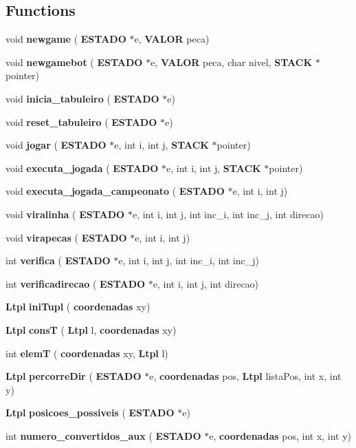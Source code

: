 \subsection*{Functions}
\begin{DoxyCompactItemize}
\item 
void \textbf{ newgame} (\textbf{ E\+S\+T\+A\+DO} $\ast$e, \textbf{ V\+A\+L\+OR} peca)
\item 
void \textbf{ newgamebot} (\textbf{ E\+S\+T\+A\+DO} $\ast$e, \textbf{ V\+A\+L\+OR} peca, char nivel, \textbf{ S\+T\+A\+CK} $\ast$pointer)
\item 
void \textbf{ inicia\+\_\+tabuleiro} (\textbf{ E\+S\+T\+A\+DO} $\ast$e)
\item 
void \textbf{ reset\+\_\+tabuleiro} (\textbf{ E\+S\+T\+A\+DO} $\ast$e)
\item 
void \textbf{ jogar} (\textbf{ E\+S\+T\+A\+DO} $\ast$e, int i, int j, \textbf{ S\+T\+A\+CK} $\ast$pointer)
\item 
void \textbf{ executa\+\_\+jogada} (\textbf{ E\+S\+T\+A\+DO} $\ast$e, int i, int j, \textbf{ S\+T\+A\+CK} $\ast$pointer)
\item 
void \textbf{ executa\+\_\+jogada\+\_\+campeonato} (\textbf{ E\+S\+T\+A\+DO} $\ast$e, int i, int j)
\item 
void \textbf{ viralinha} (\textbf{ E\+S\+T\+A\+DO} $\ast$e, int i, int j, int inc\+\_\+i, int inc\+\_\+j, int direcao)
\item 
void \textbf{ virapecas} (\textbf{ E\+S\+T\+A\+DO} $\ast$e, int i, int j)
\item 
int \textbf{ verifica} (\textbf{ E\+S\+T\+A\+DO} $\ast$e, int i, int j, int inc\+\_\+i, int inc\+\_\+j)
\item 
int \textbf{ verificadirecao} (\textbf{ E\+S\+T\+A\+DO} $\ast$e, int i, int j, int direcao)
\item 
\textbf{ Ltpl} \textbf{ ini\+Tupl} (\textbf{ coordenadas} xy)
\item 
\textbf{ Ltpl} \textbf{ consT} (\textbf{ Ltpl} l, \textbf{ coordenadas} xy)
\item 
int \textbf{ elemT} (\textbf{ coordenadas} xy, \textbf{ Ltpl} l)
\item 
\textbf{ Ltpl} \textbf{ percorre\+Dir} (\textbf{ E\+S\+T\+A\+DO} $\ast$e, \textbf{ coordenadas} pos, \textbf{ Ltpl} lista\+Pos, int x, int y)
\item 
\textbf{ Ltpl} \textbf{ posicoes\+\_\+possiveis} (\textbf{ E\+S\+T\+A\+DO} $\ast$e)
\item 
int \textbf{ numero\+\_\+convertidos\+\_\+aux} (\textbf{ E\+S\+T\+A\+DO} $\ast$e, \textbf{ coordenadas} pos, int x, int y)

\end{DoxyCompactItemize}
